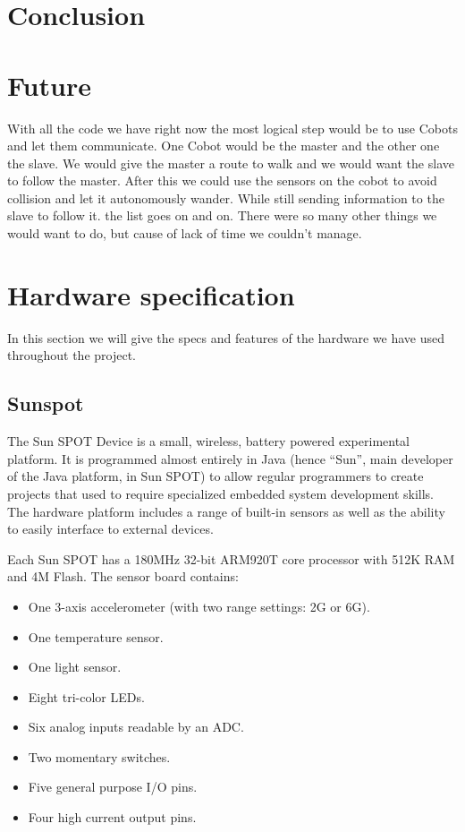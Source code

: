 \documentclass[a4paper,10pt]{article} %
\begin{document}

\section{Conclusion} %


\section{Future} %
\label{sec:future}

With all the code we have right now the most logical step would be to use Cobots
and let them communicate. One Cobot would be the master and the other one the
slave. We would give the master a route to walk and we would want the slave to
follow the master. After this we could use the sensors on the cobot to avoid
collision and let it autonomously wander. While still sending information to the
slave to follow it. the list goes on and on. There were so many other things we
would want to do, but cause of lack of time we couldn't manage.


\appendix

\section{Hardware specification} %
\label{app:hardware}

In this section we will give the specs and features of the hardware we have used
throughout the project.

\subsection{Sunspot} %
\label{app:sunspot}

The Sun SPOT Device is a small, wireless, battery powered experimental platform.
It is programmed almost entirely in Java (hence ``Sun'', main developer of the
Java platform, in Sun SPOT) to allow regular programmers to create projects that
used to require specialized embedded system development skills. The hardware
platform includes a range of built-in sensors as well as the ability to easily
interface to external devices.

Each Sun SPOT has a 180MHz 32-bit ARM920T core processor with 512K RAM and 4M
Flash. The sensor board contains:

\begin{itemize}
    \item One 3-axis accelerometer (with two range settings: 2G or 6G).
    \item One temperature sensor.
    \item One light sensor.
    \item Eight tri-color LEDs.
    \item Six analog inputs readable by an ADC.
    \item Two momentary switches.
    \item Five general purpose I/O pins.
    \item Four high current output pins.
\end{itemize}
\end{document}
